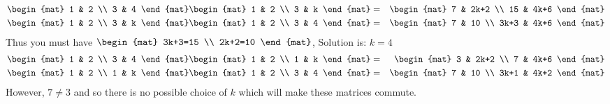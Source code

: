 \begin{Answer}
\Question \begin{eqnarray*}
\begin{mat}
1 & 2 \\
3 & 4
\end{mat}
\begin{mat}
1 & 2 \\
3 & k
\end{mat}
&=& 
\begin{mat}
7 & 2k+2 \\
15 & 4k+6
\end{mat}\\
\begin{mat}
1 & 2 \\
3 & k
\end{mat}
\begin{mat}
1 & 2 \\
3 & 4
\end{mat}
&=&
\begin{mat}
7 & 10 \\
3k+3 & 4k+6
\end{mat}
\end{eqnarray*}
Thus you must have $
\begin{mat}
3k+3=15 \\
2k+2=10
\end{mat}$, Solution is: $k=4$
\Question \begin{eqnarray*}
\begin{mat}
1 & 2 \\
3 & 4
\end{mat}
\begin{mat}
1 & 2 \\
1 & k
\end{mat}
&=&
\begin{mat}
3 & 2k+2 \\
7 & 4k+6
\end{mat}\\
\begin{mat}
1 & 2 \\
1 & k
\end{mat}
\begin{mat}
1 & 2 \\
3 & 4
\end{mat}
&=&
\begin{mat}
7 & 10 \\
3k+1 & 4k+2
\end{mat}
\end{eqnarray*}
However, $7\neq 3$ and so there is no possible choice of $k$ which
will make these matrices commute.

\end{Answer}
